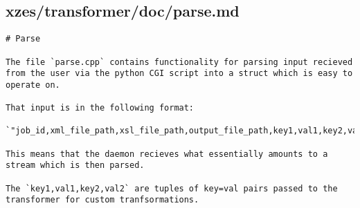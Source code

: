 \subsection{xzes/transformer/doc/parse.md}
\begin{lstlisting}
# Parse

The file `parse.cpp` contains functionality for parsing input recieved from the user via the python CGI script into a struct which is easy to operate on.

That input is in the following format:

`"job_id,xml_file_path,xsl_file_path,output_file_path,key1,val1,key2,val2,key3,..."`

This means that the daemon recieves what essentially amounts to a stream which is then parsed.

The `key1,val1,key2,val2` are tuples of key=val pairs passed to the transformer for custom tranfsormations.
\end{lstlisting}
